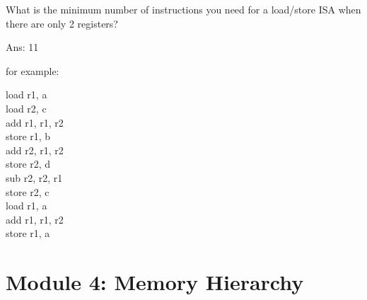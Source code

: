 \documentclass[12pt]{article}
\begin{document}
\begin{enumerate}
        What is the minimum number of instructions you need for a load/store ISA when there are only 2 registers?

        Ans: 11

        for example:

        load r1, a\\
        load r2, c\\
        add r1, r1, r2\\
        store r1, b\\
        add r2, r1, r2\\
        store r2, d\\
        sub r2, r2, r1\\
        store r2, c\\
        load r1, a\\
        add r1, r1, r2\\
        store r1, a
    \end{enumerate}

    \section{Module 4: Memory Hierarchy}
\end{document}
